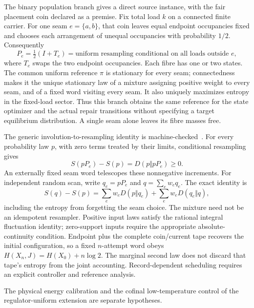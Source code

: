 \documentclass[11pt]{article}
\begin{document}
The binary population branch gives a direct source instance, with the fair
placement coin declared as a premise. Fix total load
$k$ on a connected finite carrier. For one seam $e=\{a,b\}$, that coin leaves
equal endpoint occupancies fixed and chooses each
arrangement of unequal occupancies with probability $1/2$. Consequently
\[
 P_e=\tfrac12(I+T_e)
   =\text{uniform resampling conditional on all loads outside }e,
\]
where $T_e$ swaps the two endpoint occupancies. Each fibre has one or two
states. The common uniform reference $\pi$ is stationary for every seam;
connectedness makes it the unique stationary law of a mixture assigning
positive weight to every seam, and of a fixed word visiting every seam. It also uniquely maximizes entropy in the
fixed-load sector. Thus this branch obtains the same reference for the state
optimizer and the actual repair transitions without specifying a target
equilibrium distribution. A single seam alone leaves its fibre masses free.

The generic involution-to-resampling identity is machine-checked~\cite{ophrepo}.
For every probability law $p$, with
zero terms treated by their limits, conditional resampling gives
\[
 S(pP_e)-S(p)=D(p\Vert pP_e)\geq0.
\]
An externally fixed seam word telescopes these nonnegative increments.
For independent random scan, write $q_e=pP_e$ and $q=\sum_e w_eq_e$.
The exact identity is
\[
 S(q)-S(p)=\sum_e w_eD(p\Vert q_e)+\sum_e w_eD(q_e\Vert q),
\]
including the entropy from forgetting the seam choice. The mixture need
not be an idempotent resampler. Positive input laws satisfy the rational
integral fluctuation identity; zero-support inputs require the appropriate
absolute-continuity condition. Endpoint plus the complete coin/current tape
recovers the initial configuration, so a fixed $n$-attempt word obeys
$H(X_n,J)=H(X_0)+n\log2$. The marginal second law does not discard that
tape's entropy from the joint accounting. Record-dependent scheduling
requires an explicit controller and reference analysis.

The physical energy calibration and the cofinal
low-temperature control of the regulator-uniform extension are separate
hypotheses.
\end{document}
